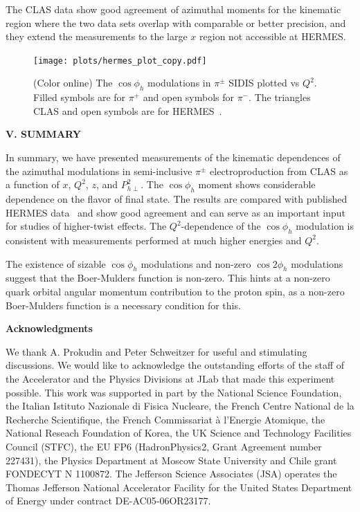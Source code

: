 \documentclass[aps,prl,twocolumn,showpacs,superscriptaddress,groupedaddress]{revtex4-1}  %
\newcommand{\Phperp}{P_{h\perp}}
\newcommand{\xbj}{x}
\begin{document}
The CLAS data show good agreement of azimuthal moments for the kinematic region where the two data sets overlap with comparable or better precision, and they extend the measurements to the large $\xbj$ region not accessible at HERMES.
\begin{figure}[h]
\begin{center}
\texttt{[image: plots/hermes\_plot\_copy.pdf]}
\end{center}
\caption{(Color online) The $\cos\phi_h$ modulations in $\pi^\pm$ SIDIS plotted vs $Q^2$. Filled symbols are for $\pi^+$ and open symbols for $\pi^-$.
The triangles CLAS and open symbols are for HERMES~\cite{Airapetian:2012yg}.}
\label{fig:clas-hermes}
\end{figure}


\begin{center}
\textbf{V. SUMMARY} \par
\end{center}
In summary, we have presented measurements of the kinematic dependences of the azimuthal modulations in semi-inclusive $\pi ^\pm$ electroproduction from CLAS as a function of $\xbj$, $Q^2$, $z$, and $\Phperp^2$.
The $\cos \phi_h$ moment shows considerable dependence on the flavor of final state.
The results are compared with published HERMES data~\cite{Airapetian:2012yg} and
show good agreement and can serve as an important input for studies of higher-twist effects.
The $Q^2$-dependence of the $\cos\phi_h$ modulation is consistent with measurements performed at much higher energies and $Q^2$.

The existence of sizable $\cos\phi_h$ modulations and non-zero $\cos 2 \phi_h$ modulations suggest that the Boer-Mulders function is non-zero.
This hints at a non-zero quark orbital angular momentum contribution to the proton spin, as a non-zero Boer-Mulders function is a necessary condition for this.

\begin{center}
\textbf{Acknowledgments} \par
\end{center}
We thank A. Prokudin and Peter Schweitzer for useful and stimulating discussions.
We would like to acknowledge the outstanding efforts of the staff of the 
Accelerator and the Physics Divisions at JLab that made this experiment possible.
This work was supported in part by 
the National Science Foundation, 
the Italian Istituto Nazionale di Fisica Nucleare, 
the French Centre National de la Recherche Scientifique,
the French Commissariat \`{a} l'Energie Atomique, 
the National Reseach Foundation of Korea,
the UK Science and Technology Facilities Council (STFC),
the EU FP6 (HadronPhysics2, Grant Agreement number 227431),
the Physics Department at Moscow State University
and Chile grant FONDECYT N 1100872.
The Jefferson Science Associates (JSA) operates the Thomas Jefferson National Accelerator Facility for the United States Department of Energy under contract DE-AC05-06OR23177.



\end{document}
